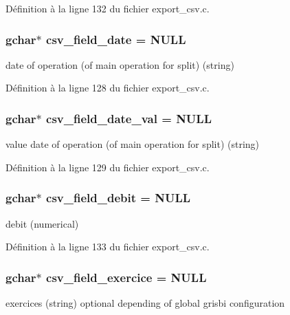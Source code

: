 Définition à la ligne 132 du fichier export\_\-csv.c.

\subsubsection[{csv\_\-field\_\-date}]{\setlength{\rightskip}{0pt plus 5cm}gchar$\ast$ {\bf csv\_\-field\_\-date} = NULL}\label{export__csv_8c_a5058bb5bd323d876d8cd4c788ef4cea0}
date of operation (of main operation for split) (string) 

Définition à la ligne 128 du fichier export\_\-csv.c.

\subsubsection[{csv\_\-field\_\-date\_\-val}]{\setlength{\rightskip}{0pt plus 5cm}gchar$\ast$ {\bf csv\_\-field\_\-date\_\-val} = NULL}\label{export__csv_8c_af71728c5ba4f9a1aa56983f7aee0c8e2}
value date of operation (of main operation for split) (string) 

Définition à la ligne 129 du fichier export\_\-csv.c.

\subsubsection[{csv\_\-field\_\-debit}]{\setlength{\rightskip}{0pt plus 5cm}gchar$\ast$ {\bf csv\_\-field\_\-debit} = NULL}\label{export__csv_8c_a785f19ac21a23c3f2910625b5f4564d3}
debit (numerical) 

Définition à la ligne 133 du fichier export\_\-csv.c.

\subsubsection[{csv\_\-field\_\-exercice}]{\setlength{\rightskip}{0pt plus 5cm}gchar$\ast$ {\bf csv\_\-field\_\-exercice} = NULL}\label{export__csv_8c_ab28b0a247154b2b7ab9aae5b8749e819}
exercices (string) optional depending of global grisbi configuration 

